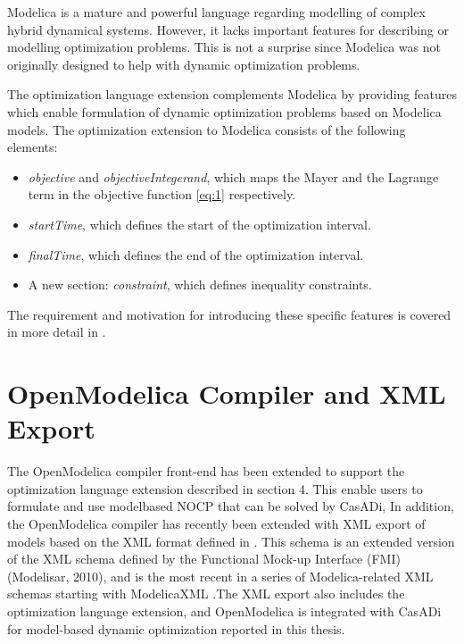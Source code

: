 Modelica is a mature and powerful language regarding modelling of complex hybrid dynamical systems. However, it
lacks important features for describing or modelling optimization problems. This is not a surprise since Modelica
was not originally designed to help with dynamic optimization problems.

The optimization language extension \cite{optimica} complements Modelica by providing features which enable
formulation of dynamic optimization problems based on Modelica models. The optimization extension to Modelica
consists of the following elements:

\begin{itemize}
	
\item \textit{objective} and \textit{objectiveIntegerand}, which maps the Mayer and the Lagrange term in 
             the objective function \ref{eq:1} respectively.
\item \textit{startTime}, which defines the start of the optimization interval.
\item \textit{finalTime}, which defines the end of the optimization interval.
\item A new section: \textit{constraint}, which defines inequality constraints.
\end{itemize}

The requirement and motivation for introducing these specific features is covered in more detail in \cite{optimica}.

\section{OpenModelica Compiler and XML Export}
\label{sec:optimizationopenmodelica}

The OpenModelica compiler front-end has been extended to support the optimization language extension described in
section 4. This enable users to formulate and use modelbased NOCP that can be solved by CasADi, In addition, the
OpenModelica compiler has recently been extended with XML export of models \cite{alachew} based on the XML
format defined in \cite{xml}. This schema is an extended version of the XML schema
defined by the Functional Mock-up Interface (FMI) (Modelisar, 2010), and is the most recent in a series of
Modelica-related XML schemas starting with ModelicaXML \cite{pop}.The XML export also includes the
optimization language extension, and OpenModelica is integrated with CasADi for model-based dynamic optimization reported in this thesis.

